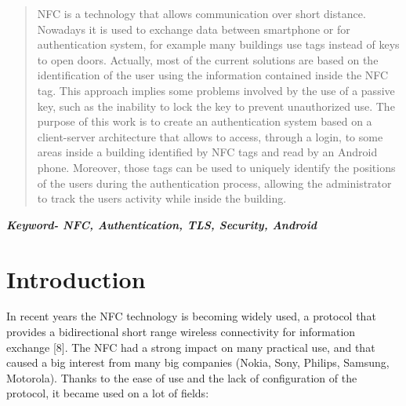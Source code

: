 \documentclass[conference]{IEEEtran}
\begin{document}
\maketitle


\begin{abstract}
NFC is a technology that allows communication over short distance. Nowadays it is used to exchange data between smartphone or for authentication system, for example many buildings use tags instead of keys to open doors.
Actually, most of the current solutions are based on the identification of the user using the information contained inside the NFC tag.
This approach implies some problems involved by the use of a passive key, such as the inability to lock the key to prevent unauthorized use.
The purpose of this work is to create an authentication system based on a client-server architecture that allows to access, through a login, to some areas inside a building identified by NFC tags and read by an Android phone.
Moreover, those tags can be used to uniquely identify the positions of the users during the authentication process, allowing the administrator to track the users activity while inside the building.\\


\end{abstract}



\textbf{\textit{Keyword- NFC, Authentication, TLS, Security, Android}}





%
\IEEEpeerreviewmaketitle



\section{Introduction}
In recent years the NFC technology is becoming widely used, a protocol that provides a bidirectional short range wireless connectivity for information exchange [8].
The NFC had a strong impact on many practical use, and that caused a big interest from many big companies (Nokia, Sony, Philips, Samsung, Motorola).
Thanks to the ease of use and the lack of configuration of the protocol, it became used on a lot of fields:
\end{document}
